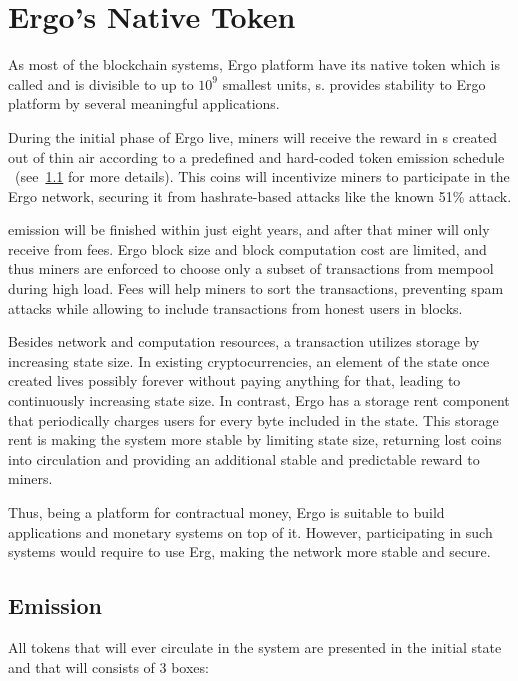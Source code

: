 \section{Ergo's Native Token}
\label{sec:currency}

As most of the blockchain systems, Ergo platform have its native token which is
called \Erg{} and is divisible to up to $10^9$ smallest units, \nanoErg{}s.
\Erg{} provides stability to Ergo platform by several meaningful applications.

During the initial phase of Ergo live, miners will receive the reward in \Erg{}s created
out of thin air according to a predefined and hard-coded token emission schedule
~(see~\ref{sec:emission} for more details).
This coins will incentivize miners to participate in the Ergo network, securing it from hashrate-based attacks
like the known 51\% attack.

\Erg{} emission will be finished within just eight years, and after that miner will only receive \Erg{} from
fees.
Ergo block size and block computation cost are limited, and thus miners are enforced to
choose only a subset of transactions from mempool during high load.
Fees will help miners to sort the transactions, preventing spam attacks while allowing
to include transactions from honest users in blocks.

Besides network and computation resources, a transaction utilizes storage by increasing state size.
In existing cryptocurrencies, an element of the state once created lives possibly forever without
paying anything for that, leading to continuously increasing state size.
In contrast, Ergo has a storage rent component that periodically charges users for every byte
included in the state.
This storage rent is making the system more stable by limiting state size, returning lost coins into
circulation and providing an additional stable and predictable reward to miners.

Thus, being a platform for contractual money, Ergo is suitable to build applications and monetary systems
on top of it.
However, participating in such systems would require to use Erg, making the network more stable and secure.

\subsection{Emission}
\label{sec:emission}


All \Erg{} tokens that will ever circulate in the system are presented in the initial state and
that will consists of 3 boxes:

